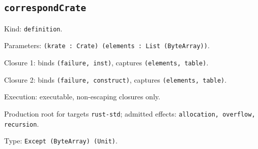 \documentclass[11pt]{article}
\begin{document}
\subsection*{\texttt{correspondCrate}}
\noindent Kind: \texttt{definition}.\par
\noindent Parameters: \texttt{(krate : Crate) (elements : List (ByteArray))}.\par
\noindent Closure 1: binds \texttt{(failure, inst)}, captures \texttt{(elements, table)}.\par
\noindent Closure 2: binds \texttt{(failure, construct)}, captures \texttt{(elements, table)}.\par
\noindent Execution: executable, non-escaping closures only.\par
\noindent Production root for targets \texttt{rust-std}; admitted effects: \texttt{allocation, overflow, recursion}.\par
\noindent Type: \texttt{Except (ByteArray) (Unit)}.\par
\end{document}
